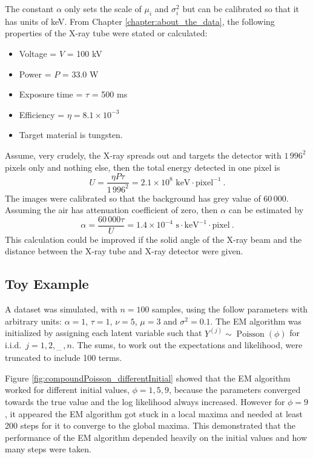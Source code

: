 \documentclass[12pt]{report}
\DeclareMathOperator{\poisson}{Poisson}
\newcommand{\dotdotdot}{_{\phantom{.}\cdots}}
\begin{document}
The constant $\alpha$ only sets the scale of $\mu_i$ and $\sigma_i^2$ but can be calibrated so that it has units of keV. From Chapter \ref{chapter:about_the_data}, the following properties of the X-ray tube were stated or calculated:
\begin{itemize}
	\item Voltage = $V$ = 100 kV
	\item Power = $P$ = 33.0 W
	\item Exposure time = $\tau$ = 500 ms
	\item Efficiency = $\eta = 8.1\times10^{-3}$
	\item Target material is tungsten.
\end{itemize}
Assume, very crudely, the X-ray spreads out and targets the detector with $1\,996^2$ pixels only and nothing else, then the total energy detected in one pixel is
\begin{equation}
U=\frac{\eta P\tau}{1\,996^2}=2.1\times10^{8}\text{ keV}\cdot\text{pixel}^{-1} \ .
\end{equation}
The images were calibrated so that the background has grey value of 60\,000. Assuming the air has attenuation coefficient of zero, then $\alpha$ can be estimated by
\begin{equation}
\alpha = \frac{60\,000 \tau}{U} = 1.4\times10^{-4}\text{ s}\cdot\text{keV}^{-1}\cdot\text{pixel} \ .
\end{equation}
This calculation could be improved if the solid angle of the X-ray beam and the distance between the X-ray tube and X-ray detector were given.

\subsection{Toy Example}
A dataset was simulated, with $n=100$ samples, using the follow parameters with arbitrary units: $\alpha=1$, $\tau=1$, $\nu=5$, $\mu=3$ and $\sigma^2=0.1$. The EM algorithm was initialized by assigning each latent variable such that $Y^{(j)}\sim\poisson(\phi)$ for i.i.d.~$j=1,2,\dotdotdot,n$. The sums, to work out the expectations and likelihood, were truncated to include 100 terms.

Figure \ref{fig:compoundPoisson_differentInitial} showed that the EM algorithm worked for different initial values, $\phi=1,5,9$, because the parameters converged towards the true value and the log likelihood always increased. However for $\phi=9$, it appeared the EM algorithm got stuck in a local maxima and needed at least 200 steps for it to converge to the global maxima. This demonstrated that the performance of the EM algorithm depended heavily on the initial values and how many steps were taken.
\end{document}
